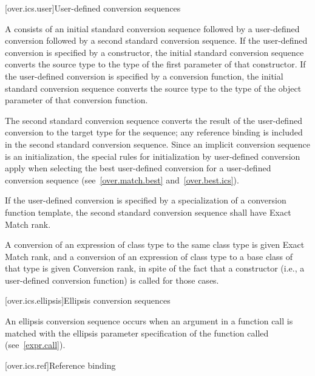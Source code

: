 [over.ics.user]{User-defined conversion sequences}

\pnum
A  consists of an initial
standard conversion sequence followed by a user-defined
conversion followed by a second standard
conversion sequence.
If the user-defined conversion is specified
by a constructor, the initial standard
conversion sequence converts the source type to the type of the
first parameter of that constructor.
If the user-defined
conversion is specified by a conversion function, the
initial standard conversion sequence
converts the source type to the type of the
object parameter of that conversion function.

\pnum
The second standard conversion sequence converts the result of
the user-defined conversion to the target type for the sequence;
any reference binding is included in the second standard
conversion sequence.
Since an implicit conversion sequence is an initialization, the
special rules for initialization by user-defined conversion apply
when selecting the best user-defined conversion for a
user-defined conversion sequence (see~\ref{over.match.best} and~\ref{over.best.ics}).

\pnum
If the user-defined conversion is specified by a
specialization of a conversion function template,
the second standard conversion sequence shall have Exact Match rank.

\pnum
A conversion of an expression of class type
to the same class type is given Exact Match rank, and
a conversion of an expression of class type
to a base class of that type is given Conversion rank,
in spite of the
fact that a constructor (i.e., a user-defined conversion
function) is called for those cases.

[over.ics.ellipsis]{Ellipsis conversion sequences}

\pnum
{}%
An ellipsis conversion sequence occurs when an argument in a
function call is matched with the ellipsis parameter
specification of the function called (see~\ref{expr.call}).

[over.ics.ref]{Reference binding}

